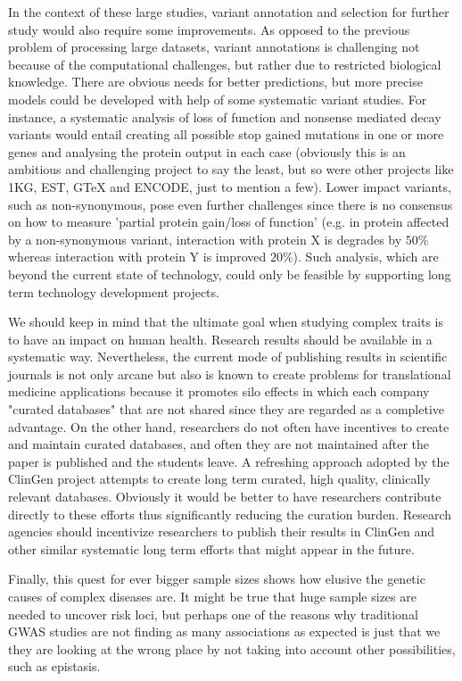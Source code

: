 In the context of these large studies, variant annotation and selection for further study would also require some improvements.
As opposed to the previous problem of processing large datasets, variant annotations is challenging not because of the computational challenges, but rather due to restricted biological knowledge.
There are obvious needs for better predictions, but more precise models could be developed with help of some systematic variant studies.
For instance, a systematic analysis of loss of function and nonsense mediated decay variants would entail creating all possible stop gained mutations in one or more genes and analysing the protein output in each case (obviously this is an ambitious and challenging project to say the least, but so were other projects like 1KG, EST, GTeX and ENCODE, just to mention a few).
Lower impact variants, such as non-synonymous, pose even further challenges since there is no consensus on how to measure 'partial protein gain/loss of function' (e.g. in protein affected by a non-synonymous variant, interaction with protein X is degrades by $50\%$ whereas interaction with protein Y is improved $20\%$).
Such analysis, which are beyond the current state of technology, could only be feasible by supporting long term technology development projects.

We should keep in mind that the ultimate goal when studying complex traits is to have an impact on human health.
Research results should be available in a systematic way.
Nevertheless, the current mode of publishing results in scientific journals is not only arcane but also is known to create problems for translational medicine applications because it promotes silo effects in which each company "curated databases" that are not shared since they are regarded as a completive advantage.
On the other hand, researchers do not often have incentives to create and maintain curated databases, and often they are not maintained after the paper is published and the students leave.
A refreshing approach adopted by the ClinGen project attempts to create long term curated, high quality, clinically relevant databases.
Obviously it would be better to have researchers contribute directly to these efforts thus significantly reducing the curation burden.
Research agencies should incentivize researchers to publish their results in ClinGen and other similar systematic long term efforts that might appear in the future.

Finally, this quest for ever bigger sample sizes shows how elusive the genetic causes of complex diseases are. 
It might be true that huge sample sizes are needed to uncover risk loci, but perhaps one of the reasons why traditional GWAS studies are not finding as many associations as expected is just that we they are looking at the wrong place by not taking into account other possibilities, such as epistasis.
